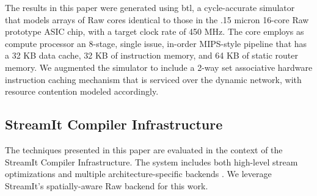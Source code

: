 The results in this paper were generated using btl, a cycle-accurate
simulator that models arrays of Raw cores identical to those in the
.15 micron 16-core Raw prototype ASIC chip, with a target clock rate
of 450 MHz. The core employs as compute processor an 8-stage, single
issue, in-order MIPS-style pipeline that has a 32 KB data cache, 32 KB
of instruction memory, and 64 KB of static router memory.  We
augmented the simulator to include a 2-way set associative hardware
instruction caching mechanism that is serviced over the dynamic
network, with resource contention modeled accordingly. 





\subsection{StreamIt Compiler Infrastructure}
The techniques presented in this paper are evaluated in the context of
the StreamIt Compiler Infrastructure.  The system includes both
high-level stream optimizations and multiple architecture-specific
backends
\cite{streamittech2,lamb:pldi:2003,agrawal:cases:2005,sermulins:lctes:2005,
karczmarek:lctes:2003,chen:graphics-hardware:2005,streamit-asplos}. We
leverage StreamIt's spatially-aware Raw backend for this work.

